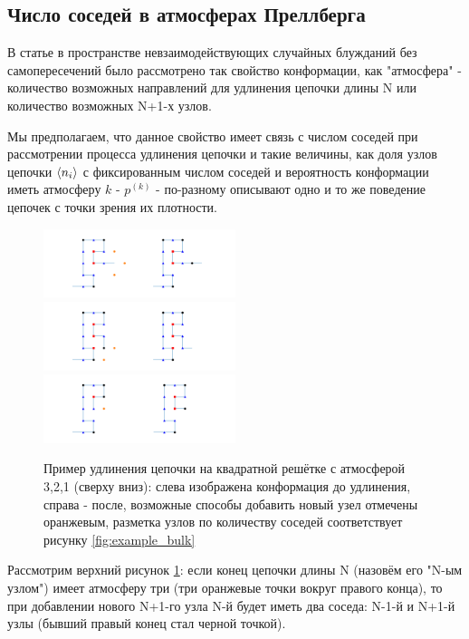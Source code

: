 \subsection{Число соседей в атмосферах Преллберга}

В статье \cite{owczarek2008scaling} в пространстве невзаимодействующих случайных блужданий без самопересечений было рассмотрено так свойство конформации, как "атмосфера" - количество возможных направлений для удлинения цепочки длины N или количество возможных N+1-х узлов.

Мы предполагаем, что данное свойство имеет связь с числом соседей при рассмотрении процесса удлинения цепочки и такие величины, как доля узлов цепочки $\langle n_{i} \rangle$ с фиксированным числом соседей и вероятность конформации иметь атмосферу $k$ - $p^{(k)}$ - по-разному описывают одно и то же поведение цепочек с точки зрения их плотности.

\begin{figure}
    \centering
    \includegraphics[width=0.5\textwidth]{Sections/Images/Atmos_to_neibors_p3.png}
    \includegraphics[width=0.5\textwidth]{Sections/Images/Atmos_to_neibors_p2.png}
    \includegraphics[width=0.5\textwidth]{Sections/Images/Atmos_to_neibors_p1.png}
    \caption{Пример удлинения цепочки на квадратной решётке с атмосферой 3,2,1 (сверху вниз): слева изображена конформация до удлинения, справа - после, возможные способы добавить новый узел отмечены оранжевым, разметка узлов по количеству соседей соответствует рисунку \ref{fig:example_bulk}}
    \label{fig:atmos_neighs}
\end{figure}

Рассмотрим верхний рисунок \ref{fig:atmos_neighs}: если конец цепочки длины N (назовём его "N-ым узлом") имеет атмосферу три (три оранжевые точки вокруг правого конца), то при добавлении нового N+1-го узла N-й будет иметь два соседа: N-1-й и N+1-й узлы (бывший правый конец стал черной точкой). 


